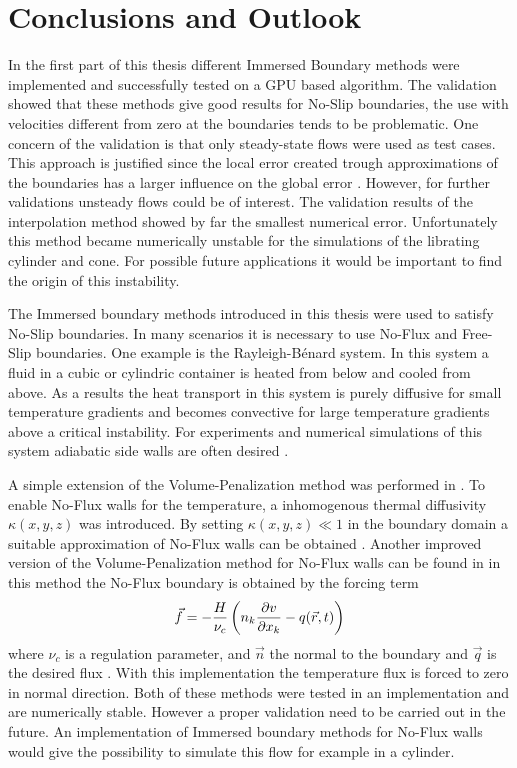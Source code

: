 \chapter{Conclusions and Outlook}

In the first part of this thesis different Immersed Boundary methods were
implemented and successfully tested on a GPU based algorithm.
The validation showed that these methods give good results for No-Slip boundaries,
the use with velocities different from zero at the boundaries tends to be problematic.
One concern of the validation is that only steady-state flows were used as test cases.
This approach is justified since the local error created trough approximations of the boundaries
has a larger influence on the global error .
However, for further validations unsteady flows could be of interest.
The validation results of the interpolation method showed by far the smallest numerical error.
Unfortunately this method became numerically unstable for the simulations of the librating cylinder and cone.
For possible future applications it would be important to find the origin of this instability.

The Immersed boundary methods introduced in this thesis were used to satisfy No-Slip boundaries.
In many scenarios it is necessary to use No-Flux and Free-Slip boundaries.
One example  is the Rayleigh-B\'{e}nard system.
In this system a fluid in a cubic or cylindric container is heated from below and cooled from above.
As a results the heat transport in this system is purely diffusive for small temperature gradients and
becomes convective for large temperature gradients above a critical instability.
For experiments and  numerical simulations of this system adiabatic side walls are often desired \citep{Lulff2011}.

A simple extension of the Volume-Penalization method was performed in \citep{Lulff2011}.
To enable No-Flux walls for the temperature, a inhomogenous thermal diffusivity $\kappa (x, y, z)$ was introduced.
By setting $\kappa(x, y, z) \ll 1$ in the boundary domain a suitable approximation of No-Flux walls can be obtained \citep{Lulff2011}.
Another improved version of the Volume-Penalization method for No-Flux walls can be found in \citep{Brown-Dymkoski2014}
in this method the No-Flux boundary is obtained by the forcing term
\begin{align}
    \vec{f}  = -\frac{H}{\nu_c}\left( n_k\pdn[v]{x_k} - q(\vec{r}, t) \right)
\end{align}
where $\nu_c$ is a regulation parameter, and $\vec{n}$ the normal to the boundary and $\vec{q}$ is the desired flux .
With this implementation the temperature flux is forced to zero in normal direction.
Both of these methods were tested in an implementation and are numerically stable.
However a proper validation need to be carried out in the future.
An implementation of Immersed boundary methods for No-Flux walls would give the possibility
to simulate this flow for example in a cylinder.

